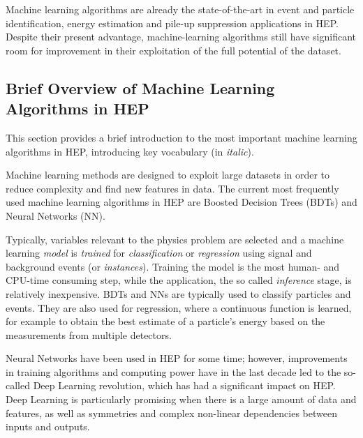 Machine learning algorithms are already the state-of-the-art in event and particle identification, energy estimation and pile-up suppression applications in HEP. Despite their present advantage, machine-learning algorithms still have significant room for improvement in their exploitation of the full potential of the dataset.


\subsection{Brief Overview of Machine Learning Algorithms in HEP}

This section provides a brief introduction to the most important machine learning algorithms in HEP, introducing key vocabulary (in \textit{italic}).


Machine learning methods are designed to exploit large datasets in order to reduce complexity and find new features in data. The current most frequently used machine learning algorithms in HEP are Boosted Decision Trees (BDTs) and Neural Networks (NN).

Typically, variables relevant to the physics problem are selected and a machine learning \textit{model} is \textit{trained} for \textit{classification} or \textit{regression} using signal and background events (or \textit{instances}).
Training the model is the most human- and CPU-time consuming step, while the application, the so called \textit{inference} stage, is relatively inexpensive.
BDTs and NNs are typically used to classify particles and events.
They are also used for regression, where a continuous function is learned, for example to obtain the best estimate of a particle's energy based on the measurements from multiple detectors.

Neural Networks have been used in HEP for some time; however, improvements in training algorithms and computing power have in the last decade led to the so-called Deep Learning
revolution, which has had a significant impact on HEP. Deep Learning is particularly promising when there is a large amount of data and features, as well as symmetries and complex non-linear dependencies between inputs and outputs.


